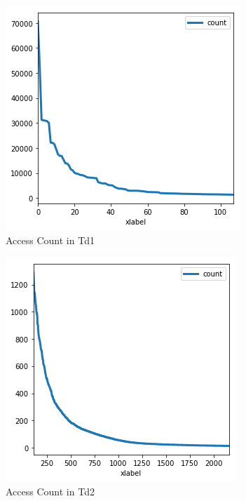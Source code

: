 \documentclass[sigconf,anonymous=false]{acmart}
\begin{document}
\begin{figure}[H]
    \centering
    \includegraphics[width=0.85\columnwidth]{figs/figure_02_td1.png}
    \caption{Access Count in Td1}
    \label{fig:my_label}
\end{figure}

\begin{figure}[H]
    \centering
    \includegraphics[width=0.80\columnwidth]{figs/figure_03_td2.png}
    \caption{Access Count in Td2}
    \label{fig:my_label}
\end{figure}
\end{document}
